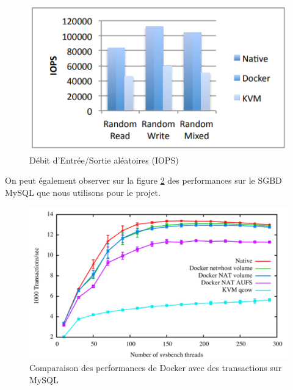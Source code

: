 \documentclass[
    iai, %
    il, %
]{heig-tb}
\begin{document}
\begin{center}
    \begin{figure}
        \includegraphics[width=\textwidth]{./assets/figures/docker-perf-random-io.png}
        \caption[Débit d'I/O aléatoires]{Débit d'Entrée/Sortie aléatoires (IOPS) \cite{rad2017introduction} \label{random-io}}
    \end{figure}
\end{center}

On peut également observer sur la figure \ref{docker-perf-mysql} des performances sur le SGBD MySQL
que nous utilisons pour le projet.

\begin{center}
    \begin{figure}
        \includegraphics[width=\textwidth]{./assets/figures/docker-perf-mysql.png}
        \caption[Comparaison des perf. Docker sur MySQ]{Comparaison des performances de Docker avec des
            transactions sur MySQL \cite{felter} \label{docker-perf-mysql}}
    \end{figure}
\end{center}
\end{document}
